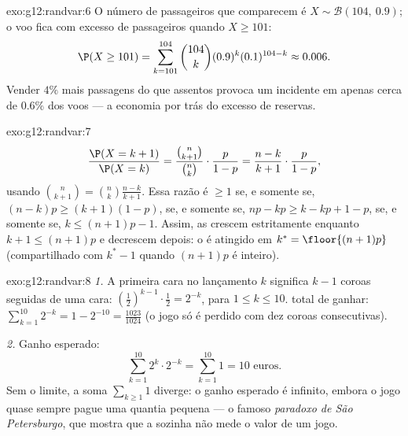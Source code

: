\begin{solution}{exo:g12:randvar:6}
O número de passageiros que comparecem é $X \sim \mathcal B(104,\ 0.9)$; o
voo fica com excesso de passageiros quando $X \geq 101$:
\[
\P(X \geq 101) = \sum_{k=101}^{104}\binom{104}{k}(0.9)^k(0.1)^{104-k}
\approx 0.006 .
\]
Vender $4\%$ mais passagens do que assentos provoca um incidente em apenas
cerca de $0.6\%$ dos voos --- a economia por trás do excesso de reservas.
\end{solution}

\begin{solution}{exo:g12:randvar:7}
\[
\frac{\P(X = k+1)}{\P(X = k)}
= \frac{\binom{n}{k+1}}{\binom nk}\cdot\frac{p}{1-p}
= \frac{n - k}{k + 1}\cdot\frac{p}{1-p},
\]
usando $\binom{n}{k+1} = \binom nk \frac{n-k}{k+1}$. Essa razão é
$\geq 1$ se, e somente se, $(n-k)p \geq (k+1)(1-p)$, se, e somente se,
$np - k p \geq k - kp + 1 - p$, se, e somente se, $k \leq (n+1)p - 1$.
Assim, as  crescem estritamente enquanto
$k + 1 \leq (n+1)p$ e decrescem depois: o  é atingido em
$k^* = \floor{(n+1)p}$ (compartilhado com $k^* - 1$ quando $(n+1)p$ é
inteiro).
\end{solution}

\begin{solution}{exo:g12:randvar:8}
\emph{1.} A primeira cara no lançamento $k$ significa $k-1$ coroas
seguidas de uma cara: 
$\left(\frac12\right)^{k-1}\cdot\frac12 = 2^{-k}$, para
$1 \leq k \leq 10$.  total de ganhar:
$\sum_{k=1}^{10} 2^{-k} = 1 - 2^{-10} = \frac{1023}{1024}$ (o jogo só é
perdido com dez coroas consecutivas).

\emph{2.} Ganho esperado:
\[
\sum_{k=1}^{10} 2^k \cdot 2^{-k} = \sum_{k=1}^{10} 1 = 10 \text{ euros}.
\]
Sem o limite, a soma $\sum_{k\geq1} 1$ diverge: o ganho esperado é
infinito, embora o jogo quase sempre pague uma quantia pequena --- o
famoso \emph{paradoxo de São Petersburgo}, que mostra que a 
sozinha não mede o valor de um jogo.
\end{solution}


